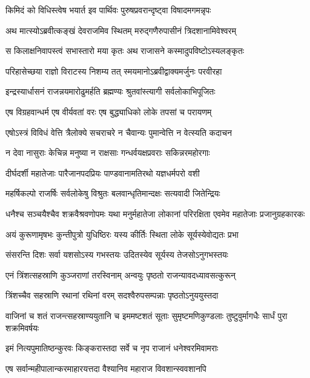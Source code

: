 \twolineshloka
{किमिदं को विधिस्त्वेष भयार्त इव पार्थिवः}
{पुरुषप्रवरान्दृष्ट्वा विषादमगमन्नृपः}


\twolineshloka
{अथ मात्स्योऽब्रवीत्कङ्खं देवराजमिव स्थितम्}
{मरुद्गणैरुपासीनं त्रिदशानामिवेश्वरम्}


\twolineshloka
{स किलाक्षनिवापस्त्वं सभास्तारो मया कृतः}
{अथ राजासने कस्मादुपविष्टोऽस्यलङ्कृतः}



\twolineshloka
{परिहासेच्छया राज्ञो विराटस्य निशम्य तत्}
{स्मयमानोऽब्रवीद्वाक्यमर्जुनः परवीरहा}


\twolineshloka
{इन्द्रस्यार्धासनं राजन्नयमारोढुमर्हति}
{ब्रह्मण्यः श्रुतवांस्त्यागी सर्वलोकाभिपूजितः}


\twolineshloka
{एष विग्रहवान्धर्म एष वीर्यवतां वरः}
{एष बुद्ध्याधिको लोके तपसां च परायणम्}


\twolineshloka
{एषोऽस्त्रं विविधं वेत्ति त्रैलोक्ये सचराचरे}
{न चैवान्यः पुमान्वेत्ति न वेत्स्यति कदाचन}


\twolineshloka
{न देवा नासुराः केचिन्न मनुष्या न राक्षसाः}
{गन्धर्वयक्षप्रवराः सकिन्नरमहोरगाः}


\twolineshloka
{दीर्घदर्शी महातेजाः पारैजानपदप्रियः}
{पाण्डवानामतिरथो यज्ञधर्मपरो वशी}


\twolineshloka
{महर्षिकल्पो राजर्षिः सर्वलोकेषु विश्रुतः}
{बलवान्धृतिमान्दक्षः सत्यवादी जितेन्द्रियः}


\threelineshloka
{धनैश्च सञ्चयैश्चैव शक्रवैश्रवणोपमः}
{यथा मनुर्महातेजा लोकानां परिरक्षिता}
{एवमेव महातेजाः प्रजानुग्रहकारकः}


\twolineshloka
{अयं कुरूणामृषभः कुन्तीपुत्रो युधिष्ठिरः}
{यस्य कीर्तिः स्थिता लोके सूर्यस्येवोद्यतः प्रभा}


\twolineshloka
{संसरन्ति दिशः सर्वा यशसोऽस्य गभस्तयः}
{उदितस्येव सूर्यस्य तेजसोऽनुगभस्तयः}


\twolineshloka
{एनं त्रिंशत्सहस्राणि कुञ्जराणां तरस्विनाम्}
{अन्वयुः पृष्ठतो राजन्यावदध्यावसत्कुरून्}


\twolineshloka
{त्रिंशच्चैव सहस्राणि रथानां रथिनां वरम्}
{सदश्वैरुपसम्पन्नाः पृष्ठतोऽनुययुस्तदा}


\threelineshloka
{वाजिनां च शतं राजन्त्सहस्राण्ययुतानि च}
{इममष्टशतं सूताः सुमृष्टमणिकुण्डलाः}
{तुष्टुवुर्मागधैः सार्धं पुरा शक्रमिवर्षयः}


\twolineshloka
{इमं नित्यपुमातिष्ठन्कुरवः किङ्करास्तदा}
{सर्वे च नृप राजानं धनेश्वरमिवामराः}


\twolineshloka
{एष सर्वान्महीपालान्करमाहारयत्तदा}
{वैश्यानिव महाराज विवशान्स्ववशानपि}


